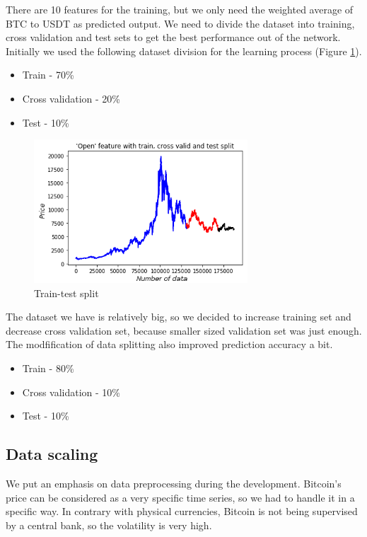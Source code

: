 \documentclass[conference]{IEEEtran}
\begin{document}
There are 10 features for the training, but we only need the weighted average of BTC to USDT as predicted output. We need to divide the dataset into training, cross validation and test sets to get the best performance out of the network. Initially we used the following dataset division for the learning process (Figure \ref{fig:TrainTestSplit}).

\begin{itemize}
  \item Train - 70\%
  \item Cross validation - 20\%
  \item Test - 10\%
\end{itemize}

\begin{figure}
  \centering
  \includegraphics[width=80mm, keepaspectratio]{figures/train_test_split_1.png}
  \caption{Train-test split}
  \label{fig:TrainTestSplit}
\end{figure}

The dataset we have is relatively big, so we decided to increase training set and decrease cross validation set, because smaller sized validation set was just enough. The modfification of data splitting also  improved prediction accuracy a bit.

\begin{itemize}
  \item Train - 80\%
  \item Cross validation - 10\%
  \item Test - 10\%
\end{itemize}

\subsection{Data scaling}

We put an emphasis on data preprocessing during the development. Bitcoin's price can be considered as a very specific time series, so we had to handle it in a specific way. In contrary with physical currencies, Bitcoin is not being supervised by a central bank, so the volatility is very high.
\end{document}
